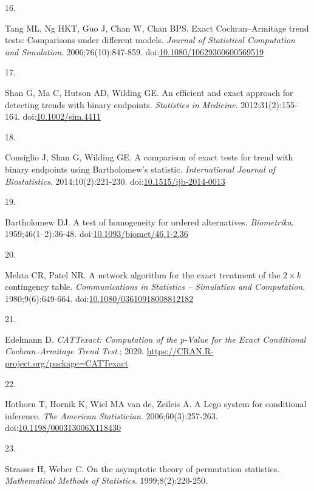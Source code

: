 \documentclass[
  11pt,
]{article}
\newlength{\cslhangindent}
\newlength{\csllabelwidth}
\newenvironment{CSLReferences}[2] %
 {\begin{list}{}{%
  \setlength{\itemindent}{0pt}
  \setlength{\leftmargin}{0pt}
  \setlength{\parsep}{0pt}
  \ifodd #1
   \setlength{\leftmargin}{\cslhangindent}
   \setlength{\itemindent}{-1\cslhangindent}
  \fi
  \setlength{\itemsep}{#2\baselineskip}}}
 {\end{list}}
\newcommand{\CSLLeftMargin}[1]{\parbox[t]{\csllabelwidth}{\strut#1\strut}}
\newcommand{\CSLRightInline}[1]{\parbox[t]{\linewidth - \csllabelwidth}{\strut#1\strut}}
\begin{document}
\begin{CSLReferences}{0}{1}
\CSLLeftMargin{16. }%
\CSLRightInline{Tang ML, Ng HKT, Guo J, Chan W, Chan BPS. Exact {Cochran--Armitage} trend tests: Comparisons under different models. \emph{Journal of Statistical Computation and Simulation}. 2006;76(10):847-859. doi:\href{https://doi.org/10.1080/10629360600569519}{10.1080/10629360600569519}}

\CSLLeftMargin{17. }%
\CSLRightInline{Shan G, Ma C, Hutson AD, Wilding GE. An efficient and exact approach for detecting trends with binary endpoints. \emph{Statistics in Medicine}. 2012;31(2):155-164. doi:\href{https://doi.org/10.1002/sim.4411}{10.1002/sim.4411}}

\CSLLeftMargin{18. }%
\CSLRightInline{Consiglio J, Shan G, Wilding GE. A comparison of exact tests for trend with binary endpoints using {Bartholomew}'s statistic. \emph{International Journal of Biostatistics}. 2014;10(2):221-230. doi:\href{https://doi.org/10.1515/ijb-2014-0013}{10.1515/ijb-2014-0013}}

\CSLLeftMargin{19. }%
\CSLRightInline{Bartholomew DJ. A test of homogeneity for ordered alternatives. \emph{Biometrika}. 1959;46(1--2):36-48. doi:\href{https://doi.org/10.1093/biomet/46.1-2.36}{10.1093/biomet/46.1-2.36}}

\CSLLeftMargin{20. }%
\CSLRightInline{Mehta CR, Patel NR. A network algorithm for the exact treatment of the \(2 \times k\) contingency table. \emph{Communications in Statistics -- Simulation and Computation}. 1980;9(6):649-664. doi:\href{https://doi.org/10.1080/03610918008812182}{10.1080/03610918008812182}}

\CSLLeftMargin{21. }%
\CSLRightInline{Edelmann D. \emph{{CATTexact}: Computation of the p-Value for the Exact Conditional {Cochran--Armitage} Trend Test}.; 2020. \url{https://CRAN.R-project.org/package=CATTexact}}

\CSLLeftMargin{22. }%
\CSLRightInline{Hothorn T, Hornik K, Wiel MA van de, Zeileis A. A {Lego} system for conditional inference. \emph{The American Statistician}. 2006;60(3):257-263. doi:\href{https://doi.org/10.1198/000313006X118430}{10.1198/000313006X118430}}

\CSLLeftMargin{23. }%
\CSLRightInline{Strasser H, Weber C. On the asymptotic theory of permutation statistics. \emph{Mathematical Methods of Statistics}. 1999;8(2):220-250.}


\end{CSLReferences}
\end{document}
